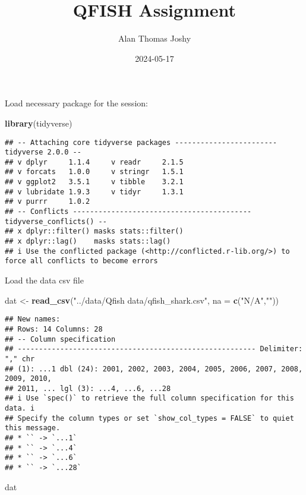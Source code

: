 \documentclass[
]{article}
\title{QFISH Assignment}
\author{Alan Thomas Joshy}
\date{2024-05-17}
\newenvironment{Shaded}{\begin{snugshade}}{\end{snugshade}}
\newcommand{\AttributeTok}[1]{\textcolor[rgb]{0.13,0.29,0.53}{#1}}
\newcommand{\FunctionTok}[1]{\textcolor[rgb]{0.13,0.29,0.53}{\textbf{#1}}}
\newcommand{\NormalTok}[1]{#1}
\newcommand{\OtherTok}[1]{\textcolor[rgb]{0.56,0.35,0.01}{#1}}
\newcommand{\StringTok}[1]{\textcolor[rgb]{0.31,0.60,0.02}{#1}}
\begin{document}
\maketitle

Load necessary package for the session:

\begin{Shaded}
\begin{Highlighting}[]
\FunctionTok{library}\NormalTok{(tidyverse)}
\end{Highlighting}
\end{Shaded}

\begin{verbatim}
## -- Attaching core tidyverse packages ------------------------ tidyverse 2.0.0 --
## v dplyr     1.1.4     v readr     2.1.5
## v forcats   1.0.0     v stringr   1.5.1
## v ggplot2   3.5.1     v tibble    3.2.1
## v lubridate 1.9.3     v tidyr     1.3.1
## v purrr     1.0.2     
## -- Conflicts ------------------------------------------ tidyverse_conflicts() --
## x dplyr::filter() masks stats::filter()
## x dplyr::lag()    masks stats::lag()
## i Use the conflicted package (<http://conflicted.r-lib.org/>) to force all conflicts to become errors
\end{verbatim}

Load the data csv file

\begin{Shaded}
\begin{Highlighting}[]
\NormalTok{dat }\OtherTok{\textless{}{-}} \FunctionTok{read\_csv}\NormalTok{(}\StringTok{"../data/Qfish data/qfish\_shark.csv"}\NormalTok{, }\AttributeTok{na =} \FunctionTok{c}\NormalTok{(}\StringTok{"N/A"}\NormalTok{,}\StringTok{""}\NormalTok{))}
\end{Highlighting}
\end{Shaded}

\begin{verbatim}
## New names:
## Rows: 14 Columns: 28
## -- Column specification
## -------------------------------------------------------- Delimiter: "," chr
## (1): ...1 dbl (24): 2001, 2002, 2003, 2004, 2005, 2006, 2007, 2008, 2009, 2010,
## 2011, ... lgl (3): ...4, ...6, ...28
## i Use `spec()` to retrieve the full column specification for this data. i
## Specify the column types or set `show_col_types = FALSE` to quiet this message.
## * `` -> `...1`
## * `` -> `...4`
## * `` -> `...6`
## * `` -> `...28`
\end{verbatim}

\begin{Shaded}
\begin{Highlighting}[]
\NormalTok{dat}
\end{Highlighting}
\end{Shaded}
\end{document}
